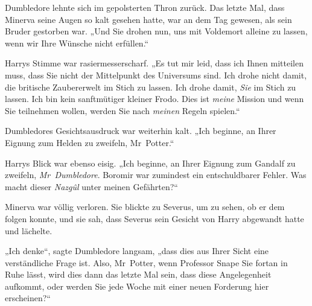 Dumbledore lehnte sich im gepolsterten Thron zurück. Das letzte Mal, dass Minerva seine Augen so kalt gesehen hatte, war an dem Tag gewesen, als sein Bruder gestorben war. „Und Sie drohen nun, uns mit Voldemort alleine zu lassen, wenn wir Ihre Wünsche nicht erfüllen.“

Harrys Stimme war rasiermesserscharf. „Es tut mir leid, dass ich Ihnen mitteilen muss, dass Sie nicht der Mittelpunkt des Universums sind. Ich drohe nicht damit, die britische Zaubererwelt im Stich zu lassen. Ich drohe damit, \emph{Sie} im Stich zu lassen. Ich bin kein sanftmütiger kleiner Frodo. Dies ist \emph{meine} Mission und wenn Sie teilnehmen wollen, werden Sie nach \emph{meinen} Regeln spielen.“

Dumbledores Gesichtsausdruck war weiterhin kalt. „Ich beginne, an Ihrer Eignung zum Helden zu zweifeln, Mr~Potter.“

Harrys Blick war ebenso eisig. „Ich beginne, an Ihrer Eignung zum Gandalf zu zweifeln, \emph{Mr~Dumbledore}. Boromir war zumindest ein entschuldbarer Fehler. Was macht dieser \emph{Nazgûl} unter meinen Gefährten?“

Minerva war völlig verloren. Sie blickte zu Severus, um zu sehen, ob er dem folgen konnte, und sie sah, dass Severus sein Gesicht von Harry abgewandt hatte und lächelte.

„Ich denke“, sagte Dumbledore langsam, „dass dies aus Ihrer Sicht eine verständliche Frage ist. Also, Mr~Potter, wenn Professor Snape Sie fortan in Ruhe lässt, wird dies dann das letzte Mal sein, dass diese Angelegenheit aufkommt, oder werden Sie jede Woche mit einer neuen Forderung hier erscheinen?“

